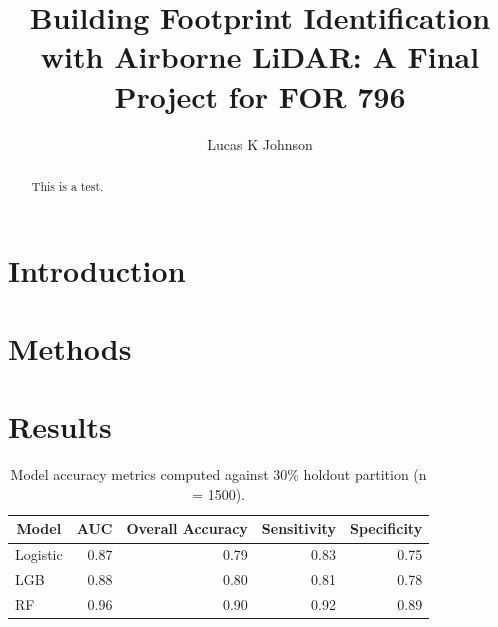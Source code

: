 \documentclass[]{elsarticle} %
\begin{document}
\begin{frontmatter}

  \title{Building Footprint Identification with Airborne LiDAR: A Final Project for FOR 796}
    \author[]{Lucas K Johnson}
  
      
  \begin{abstract}
  This is a test.
  \end{abstract}
  
 \end{frontmatter}

\hypertarget{introduction}{%
\section{Introduction}\label{introduction}}

\hypertarget{methods}{%
\section{Methods}\label{methods}}

\hypertarget{results}{%
\section{Results}\label{results}}

\begin{table}

\caption{\label{tab:metrics}Model accuracy metrics computed against 30\% holdout partition (n = 1500).}
\centering
\fontsize{12}{14}\selectfont
\begin{tabular}[t]{lrrrr}
\toprule
\multicolumn{1}{c}{Model} & \multicolumn{1}{c}{AUC} & \multicolumn{1}{c}{Overall Accuracy} & \multicolumn{1}{c}{Sensitivity} & \multicolumn{1}{c}{Specificity}\\
\midrule
Logistic & 0.87 & 0.79 & 0.83 & 0.75\\
\addlinespace
LGB & 0.88 & 0.80 & 0.81 & 0.78\\
\addlinespace
RF & 0.96 & 0.90 & 0.92 & 0.89\\
\bottomrule
\end{tabular}
\end{table}
\end{document}
